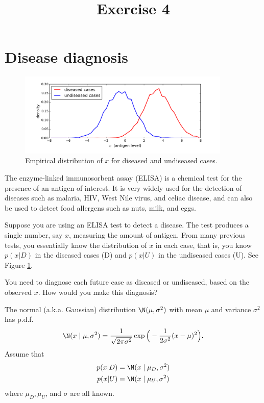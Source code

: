 \documentclass[12pt]{article}
\title{Exercise 4}
\author{}
\date{}
\begin{document}
\maketitle





\section*{Disease diagnosis}

\begin{figure}
  \begin{center}
    \includegraphics[width=0.9\textwidth]{disease.png}
  \end{center}
  \caption{Empirical distribution of $x$ for diseased and undiseased cases.}
  \label{figure:disease}
\end{figure}

The enzyme-linked immunosorbent assay (ELISA) is a chemical test for the presence of an antigen of interest. It is very widely used for the detection of diseases such as malaria, HIV, West Nile virus, and celiac disease, and can also be used to detect food allergens such as nuts, milk, and eggs.

Suppose you are using an ELISA test to detect a disease. The test produces a single number, say $x$, measuring the amount of antigen. From many previous tests, you essentially know the distribution of $x$ in each case, that is, you know $p(x|D)$ in the diseased cases (D) and $p(x|U)$ in the undiseased cases (U). See Figure \ref{figure:disease}.

You need to diagnose each future case as diseased or undiseased, based on the observed $x$. How would you make this diagnosis?


\vspace{4em}
The normal (a.k.a. Gaussian) distribution $\N(\mu,\sigma^2)$ with mean $\mu$ and variance $\sigma^2$ has p.d.f.
$$ \N(x\mid \mu,\sigma^2) = \frac{1}{\sqrt{2\pi\sigma^2}}\exp\Big(-\frac{1}{2\sigma^2}(x-\mu)^2\Big). $$
Assume that
\begin{align*}
p(x|D) &=\N(x\mid \mu_D,\sigma^2) \\
p(x|U) &=\N(x\mid \mu_U,\sigma^2)
\end{align*}
where $\mu_D,\mu_U$, and $\sigma$ are all known.
\end{document}
